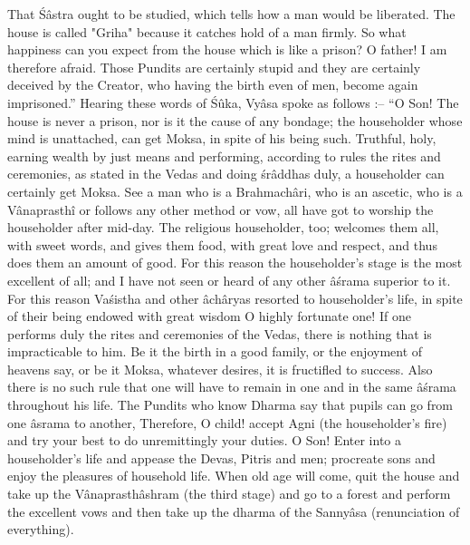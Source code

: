 That \'S\^astra ought to be studied, which tells how a man would be liberated. The house is called "Griha" because it catches hold of a man firmly. So what happiness can you expect from the house which is like a prison? O father! I am therefore afraid. Those Pundits are certainly stupid and they are certainly deceived by the Creator, who having the birth even of men, become again imprisoned.'' Hearing these words of \'S\^uka, Vy\^asa spoke as follows :-- ``O Son! The house is never a prison, nor is it the cause of any bondage; the householder whose mind is unattached, can get Moksa, in spite of his being such. Truthful, holy, earning wealth by just means and performing, according to rules the rites and ceremonies, as stated in the Vedas and doing \'sr\^addhas duly, a householder can certainly get Moksa. See a man who is a Brahmach\^ari, who is an ascetic, who is a V\^anaprasth\^i or follows any other method or vow, all have got to worship the householder after mid-day. The religious householder, too; welcomes them all, with sweet words, and gives them food, with great love and respect, and thus does them an amount of good. For this reason the householder's stage is the most excellent of all; and I have not seen or heard of any other \^a\'srama superior to it. For this reason Va\'sistha and other \^ach\^aryas resorted to householder's life, in spite of their being endowed with great wisdom O highly fortunate one! If one performs duly the rites and ceremonies of the Vedas, there is nothing that is impracticable to him. Be it the birth in a good family, or the enjoyment of heavens say, or be it Moksa, whatever desires, it is fructifled to success. Also there is no such rule that one will have to remain in one and in the same \^a\'srama throughout his life. The Pundits who know Dharma say that pupils can go from one \^asrama to another, Therefore, O child! accept Agni (the householder's fire) and try your best to do unremittingly your duties. O Son! Enter into a householder's life and appease the Devas, Pitris and men; procreate sons and enjoy the pleasures of household life. When old age will come, quit the house and take up the V\^anaprasth\^ashram (the third stage) and go to a forest and perform the excellent vows and then take up the dharma of the Sanny\^asa (renunciation of everything).

